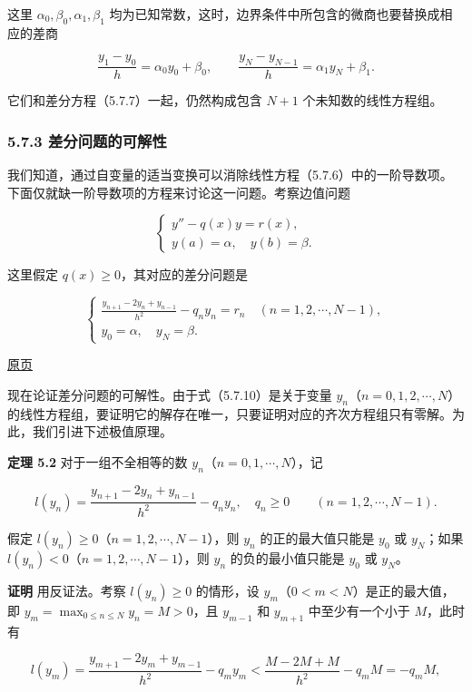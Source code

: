 \documentclass[
  10pt,
  fontset=fandol]{ctexart}
\begin{document}
这里 \(\alpha_0,\beta_0,\alpha_1,\beta_1\) 均为已知常数，这时，边界条件中所包含的微商也要替换成相应的差商

\[
\frac{y_1-y_0}{h}=\alpha_0y_0+\beta_0,\qquad
\frac{y_N-y_{N-1}}h=\alpha_1y_N+\beta_1.
\]

它们和差分方程（5.7.7）一起，仍然构成包含 \(N+1\) 个未知数的线性方程组。

\subsubsection{5.7.3 差分问题的可解性}\label{ux5deeux5206ux95eeux9898ux7684ux53efux89e3ux6027}

我们知道，通过自变量的适当变换可以消除线性方程（5.7.6）中的一阶导数项。下面仅就缺一阶导数项的方程来讨论这一问题。考察边值问题

\[
\begin{cases}
y''-q(x)y=r(x),\\
y(a)=\alpha,\quad y(b)=\beta.
\end{cases}
\tag{5.7.9}
\]

这里假定 \(q(x)\ge0\)，其对应的差分问题是

\[
\begin{cases}
\displaystyle\frac{y_{n+1}-2y_n+y_{n-1}}{h^2}-q_ny_n=r_n\quad(n=1,2,\cdots,N-1),\\[6pt]
y_0=\alpha,\quad y_N=\beta.
\end{cases}
\tag{5.7.10}
\]

\href{../../source-images/pdf-151.jpeg}{原页}

现在论证差分问题的可解性。由于式（5.7.10）是关于变量 \(y_n\)（\(n=0,1,2,\cdots,N\)）的线性方程组，要证明它的解存在唯一，只要证明对应的齐次方程组只有零解。为此，我们引进下述极值原理。

\textbf{定理 5.2} 对于一组不全相等的数 \(y_n\)（\(n=0,1,\cdots,N\)），记

\[
l(y_n)=\frac{y_{n+1}-2y_n+y_{n-1}}{h^2}-q_ny_n,\quad q_n\ge0\qquad(n=1,2,\cdots,N-1).
\]

假定 \(l(y_n)\ge0\)（\(n=1,2,\cdots,N-1\)），则 \(y_n\) 的正的最大值只能是 \(y_0\) 或 \(y_N\)；如果 \(l(y_n)<0\)（\(n=1,2,\cdots,N-1\)），则 \(y_n\) 的负的最小值只能是 \(y_0\) 或 \(y_N\)。

\textbf{证明} 用反证法。考察 \(l(y_n)\ge0\) 的情形，设 \(y_m\)（\(0<m<N\)）是正的最大值，即 \(y_m=\max_{0\le n\le N}y_n=M>0\)，且 \(y_{m-1}\) 和 \(y_{m+1}\) 中至少有一个小于 \(M\)，此时有

\[
l(y_m)=\frac{y_{m+1}-2y_m+y_{m-1}}{h^2}-q_my_m<\frac{M-2M+M}{h^2}-q_mM=-q_mM,
\]
\end{document}
